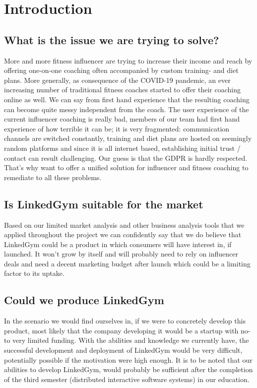 \section{Introduction}

\subsection{What is the issue we are trying to solve?}
More and more fitness influencer are trying to increase their income and reach by offering one-on-one coaching often accompanied by custom training- and diet plans. More generally, as consequence of the COVID-19 pandemic, an ever increasing number of traditional fitness coaches started to offer their coaching online as well.
We can say from first hand experience that the resulting coaching can become quite messy independent from the coach.
The user experience of the current influencer coaching is really bad, members of our team had first hand experience of how terrible it can be; it is very fragmented: communication channels are switched constantly, training and diet plans are hosted on seemingly random platforms and since it is all internet based, establishing initial trust / contact can result challenging. Our guess is that the GDPR is hardly respected.
That's why want to offer a unified solution for influencer and fitness coaching to remediate to all these problems.

\subsection{Is LinkedGym suitable for the market}

Based on our limited market analysis and other business analysis tools that we applied throughout the project we can confidently say that we do believe that LinkedGym could be a product in which consumers will have interest in, if launched. It won't grow by itself and will probably need to rely on influencer deals and need a decent marketing budget after launch which could be a limiting factor to its uptake.

\subsection{Could we produce LinkedGym}
In the scenario we would find ourselves in, if we were to concretely develop this product, most likely that the company developing it would be a startup with no- to very limited funding. With the abilities and knowledge we currently have, the successful development and deployment of LinkedGym would be very difficult, potentially possible if the motivation were high enough. It is to be noted that our abilities to develop LinkedGym, would probably be sufficient after the completion of the third semester (distributed interactive software systems) in our education.

